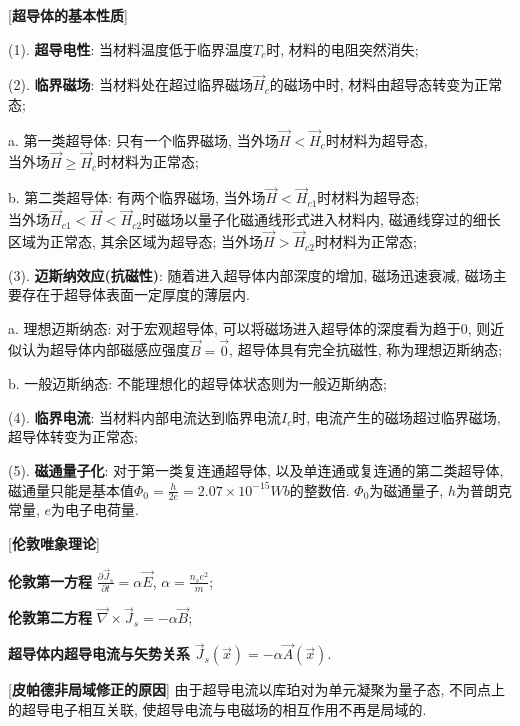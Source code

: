 [\textbf{超导体的基本性质}]\par
\qquad (1). \textbf{超导电性}: 当材料温度低于临界温度$T_c$时, 材料的电阻突然消失;\par
\qquad (2). \textbf{临界磁场}: 当材料处在超过临界磁场$\vec H_c$的磁场中时, 材料由超导态转变为正常态;\par
\qquad \qquad a. 第一类超导体: 只有一个临界磁场, 当外场$\vec H < \vec H_c$时材料为超导态, \\ 当外场$\vec H\ge \vec H_c$时材料为正常态;\par
\qquad \qquad b. 第二类超导体: 有两个临界磁场, 当外场$\vec H < \vec H_{c1}$时材料为超导态; \\ 当外场$\vec H_{c1}<\vec H<\vec H_{c2}$时磁场以量子化磁通线形式进入材料内, 磁通线穿过的细长区域为正常态, 其余区域为超导态; 当外场$\vec H > \vec H_{c2}$时材料为正常态;\par
\qquad (3). \textbf{迈斯纳效应(抗磁性)}: 随着进入超导体内部深度的增加, 磁场迅速衰减, 磁场主要存在于超导体表面一定厚度的薄层内.\par
\qquad \qquad a. 理想迈斯纳态: 对于宏观超导体, 可以将磁场进入超导体的深度看为趋于$0$, 则近似认为超导体内部磁感应强度$\vec B=\vec 0$, 超导体具有完全抗磁性, 称为理想迈斯纳态;\par
\qquad \qquad b. 一般迈斯纳态: 不能理想化的超导体状态则为一般迈斯纳态;\par
\qquad (4). \textbf{临界电流}: 当材料内部电流达到临界电流$I_c$时, 电流产生的磁场超过临界磁场, 超导体转变为正常态;\par
\qquad (5). \textbf{磁通量子化}: 对于第一类复连通超导体, 以及单连通或复连通的第二类超导体, 磁通量只能是基本值$\Phi_0=\frac{h}{2e}=2.07\times 10^{-15}Wb$的整数倍. $\Phi_0$为磁通量子, $h$为普朗克常量, $e$为电子电荷量.\par

[\textbf{伦敦唯象理论}]\par
\qquad \textbf{伦敦第一方程} $\frac{\partial\vec J_s}{\partial t}=\alpha \vec E$, $\alpha=\frac{n_se^2}{m}$;\par
\qquad \textbf{伦敦第二方程} $\vec\nabla\times\vec J_s=-\alpha\vec B$;\par
\qquad \textbf{超导体内超导电流与矢势关系} $\vec J_s(\vec x)=-\alpha\vec A(\vec x)$.\par

[\textbf{皮帕德非局域修正的原因}] 由于超导电流以库珀对为单元凝聚为量子态, 不同点上的超导电子相互关联, 使超导电流与电磁场的相互作用不再是局域的.


